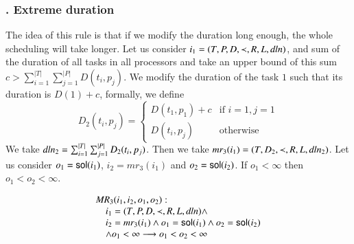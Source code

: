 



\subsubsection{. Extreme duration}
The idea of this rule is that if we modify the duration long enough,
the whole scheduling will take longer. Let us consider
$i_{1}=(T, P, D, \prec, R, L, \mathit{dln})$, and sum of the duration
of all tasks in all processors and take an upper bound of this sum
$c>\sum_{i=1}^{|T|}\sum_{j=1}^{|P|}D(t_{i},p_{j})$. We modify the
duration of the task $1$ such that its duration is $D(1)+c$, formally, we
define
\begin{displaymath}
  D_{2}(t_{i}, p_{j})=
  \begin{cases}
    D(t_{1}, p_{1}) + c & \text{if } i=1, j=1\\
    D(t_{i}, p_{j}) & \text{otherwise}
  \end{cases}
\end{displaymath}
We take $\mathit{dln}_{2}=\sum_{i=1}^{|T|}\sum_{j=1}^{|P|}D_{2}(t_{i},p_{j})$.
Then we take $mr_{3}(i_{1})=(T, D_{2}, \prec, R, L, \mathit{dln}_{2})$. Let us
consider $o_{1}=\mathsf{sol}(i_{1})$, $i_{2}=mr_{3}(i_{1})$ and
$o_{2}=\mathsf{sol}(i_{2})$.
If $o_{1}<\infty$ then $o_{1}<o_{2}<\infty$.

\begin{framed}
  \begin{displaymath}
      \begin{array}{l}
    \mathit{MR}_{3}(i_1,i_2,o_{1},o_{2}):\\
      \hskip 1em i_1=(T,P,D,\prec,R,L,\mathit{dln}) \wedge  \\
      \hskip 1em  i_2=mr_3(i_1)\wedge o_{1}=\mathsf{sol}(i_{1})\wedge o_{2}=\mathsf{sol}(i_2)\\
      \hskip 1em \wedge o_{1}<\infty
      \longrightarrow o_{1}<o_2<\infty
    \end{array}
  \end{displaymath}
\end{framed}











